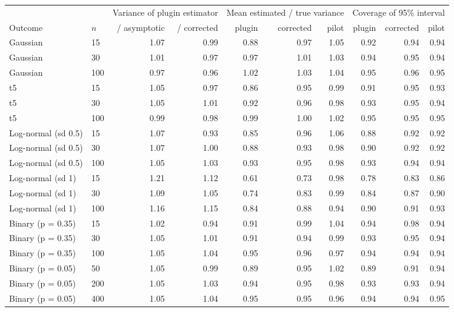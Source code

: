 \begin{tabular}{llrrrrrrrr}
\toprule
 & & \multicolumn{2}{c}{Variance of plugin estimator} & \multicolumn{3}{c}{Mean estimated / true variance} & \multicolumn{3}{c}{Coverage of 95\% interval} \\
\cmidrule(lr){3-4}\cmidrule(lr){5-7}\cmidrule(lr){8-10}
Outcome & $n$ & / asymptotic & / corrected & plugin & corrected & pilot & plugin & corrected & pilot \\
\midrule
Gaussian & 15 & 1.07 & 0.99 & 0.88 & 0.97 & 1.05 & 0.92 & 0.94 & 0.94 \\
Gaussian & 30 & 1.01 & 0.97 & 0.97 & 1.01 & 1.03 & 0.94 & 0.95 & 0.94 \\
Gaussian & 100 & 0.97 & 0.96 & 1.02 & 1.03 & 1.04 & 0.95 & 0.96 & 0.95 \\
t5 & 15 & 1.05 & 0.97 & 0.86 & 0.95 & 0.99 & 0.91 & 0.95 & 0.93 \\
t5 & 30 & 1.05 & 1.01 & 0.92 & 0.96 & 0.98 & 0.93 & 0.95 & 0.94 \\
t5 & 100 & 0.99 & 0.98 & 0.99 & 1.00 & 1.02 & 0.95 & 0.95 & 0.95 \\
Log-normal (sd 0.5) & 15 & 1.07 & 0.93 & 0.85 & 0.96 & 1.06 & 0.88 & 0.92 & 0.92 \\
Log-normal (sd 0.5) & 30 & 1.07 & 1.00 & 0.88 & 0.93 & 0.98 & 0.90 & 0.92 & 0.92 \\
Log-normal (sd 0.5) & 100 & 1.05 & 1.03 & 0.93 & 0.95 & 0.98 & 0.93 & 0.94 & 0.94 \\
Log-normal (sd 1) & 15 & 1.21 & 1.12 & 0.61 & 0.73 & 0.98 & 0.78 & 0.83 & 0.86 \\
Log-normal (sd 1) & 30 & 1.09 & 1.05 & 0.74 & 0.83 & 0.99 & 0.84 & 0.87 & 0.90 \\
Log-normal (sd 1) & 100 & 1.16 & 1.15 & 0.84 & 0.88 & 0.94 & 0.90 & 0.91 & 0.93 \\
Binary (p = 0.35) & 15 & 1.02 & 0.94 & 0.91 & 0.99 & 1.04 & 0.94 & 0.98 & 0.94 \\
Binary (p = 0.35) & 30 & 1.05 & 1.01 & 0.91 & 0.94 & 0.99 & 0.93 & 0.95 & 0.94 \\
Binary (p = 0.35) & 100 & 1.05 & 1.04 & 0.95 & 0.96 & 0.97 & 0.94 & 0.94 & 0.94 \\
Binary (p = 0.05) & 50 & 1.05 & 0.99 & 0.89 & 0.95 & 1.02 & 0.89 & 0.91 & 0.94 \\
Binary (p = 0.05) & 200 & 1.05 & 1.03 & 0.94 & 0.95 & 0.98 & 0.93 & 0.93 & 0.94 \\
Binary (p = 0.05) & 400 & 1.05 & 1.04 & 0.95 & 0.95 & 0.96 & 0.94 & 0.94 & 0.95 \\
\bottomrule
\end{tabular}

